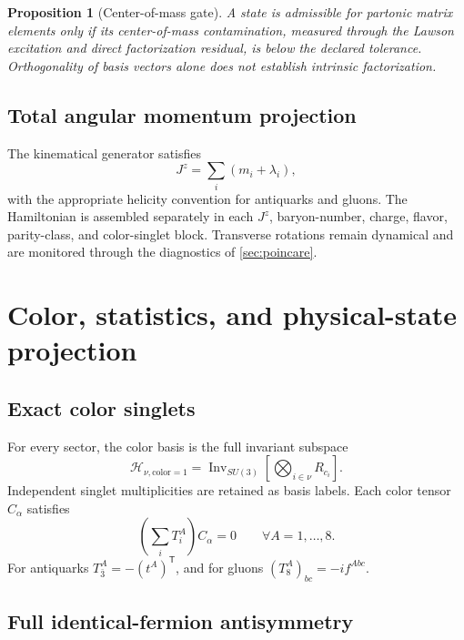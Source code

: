 \documentclass[11pt]{article}
\newtheorem{proposition}[definition]{Proposition}
\newcommand{\Hil}{\mathcal H}
\newcommand{\Jz}{J^z}
\begin{document}
\begin{proposition}[Center-of-mass gate]
A state is admissible for partonic matrix elements only if its center-of-mass
contamination, measured through the Lawson excitation and direct factorization
residual, is below the declared tolerance.  Orthogonality of basis vectors
alone does not establish intrinsic factorization.
\label{prop:com-gate}
\end{proposition}

\subsection{Total angular momentum projection}

The kinematical generator satisfies
\begin{equation}
 \Jz=\sum_i\left(m_i+\lambda_i\right),
 \label{eq:jz-basis}
\end{equation}
with the appropriate helicity convention for antiquarks and gluons.  The
Hamiltonian is assembled separately in each \(\Jz\), baryon-number, charge,
flavor, parity-class, and color-singlet block.  Transverse rotations remain
dynamical and are monitored through the diagnostics of
\cref{sec:poincare}.

\section{Color, statistics, and physical-state projection}
\label{sec:color-statistics}

\subsection{Exact color singlets}

For every sector, the color basis is the full invariant subspace
\begin{equation}
 \Hil_{\nu,\mathrm{color}=1}
 =\operatorname{Inv}_{SU(3)}
 \left[
 \bigotimes_{i\in\nu}R_{c_i}
 \right].
 \label{eq:color-invariant-space}
\end{equation}
Independent singlet multiplicities are retained as basis labels.  Each color
tensor \(C_\alpha\) satisfies
\begin{equation}
 \left(\sum_i T_i^A\right)C_\alpha=0
 \qquad \forall A=1,\ldots,8.
 \label{eq:color-generator-test}
\end{equation}
For antiquarks \(T_{\bar3}^A=-(t^A)^{\mathsf T}\), and for gluons
\((T_8^A)_{bc}=-if^{Abc}\).

\subsection{Full identical-fermion antisymmetry}
\end{document}
